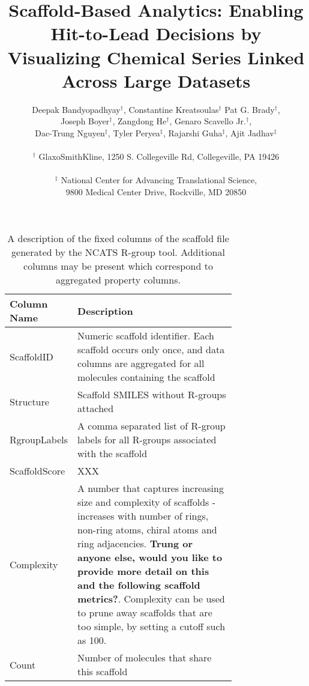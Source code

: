 \documentclass[11pt,letterpaper]{article}
\begin{document}
\title{Scaffold-Based Analytics: Enabling Hit-to-Lead Decisions by
  Visualizing Chemical Series Linked Across Large Datasets}
\author{Deepak Bandyopadhyay$^{\dagger}$, Constantine Kreatsoulas$^{\dagger}$
  Pat G. Brady$^{\dagger}$, \\
  Joseph Boyer$^{\dagger}$, Zangdong He$^{\dagger}$, 
  Genaro Scavello Jr.$^{\dagger}$,\\
  Dac-Trung Nguyen$^{\ddagger}$,
  Tyler Peryea$^{\ddagger}$,
  Rajarshi Guha$^{\ddagger}$,
  Ajit Jadhav$^{\ddagger}$ \\
\\
$^{\dagger}$ GlaxoSmithKline, 1250 S. Collegeville Rd, Collegeville,
PA 19426 \\
\\
$^{\ddagger}$ National Center for Advancing Translational Science, \\ 9800 Medical Center Drive, Rockville, MD 20850}
\maketitle

\begin{table}[h]
  \centering
  \begin{tabular}[h]{lp{0.75\linewidth}}
\hline
    \textbf{Column Name} & \textbf{Description} \\
    \hline
    ScaffoldID & Numeric scaffold identifier. Each scaffold occurs only
    once, and data columns are aggregated for all molecules containing the
    scaffold \\
    Structure & Scaffold SMILES without R-groups attached \\
    RgroupLabels & A comma separated list of R-group labels for
    all R-groups associated with the scaffold \\
    ScaffoldScore & XXX \\
    Complexity & A number that captures increasing size and complexity of
    scaffolds - increases with number of rings, non-ring atoms, chiral
    atoms and ring adjacencies. \textbf{Trung or anyone else, would you
      like to provide more detail on this and the following scaffold
      metrics?}. Complexity can be used to prune away scaffolds that are
    too simple, by setting a cutoff such as 100. \\
    Count & Number of molecules that share this scaffold \\
    \hline
  \end{tabular}
  \caption{A description of the fixed columns of the scaffold file generated
    by the NCATS R-group tool. Additional columns may be present which
    correspond to aggregated property columns.}
  \label{table:scaffoldfilecolumns}
\end{table}
\end{document}
